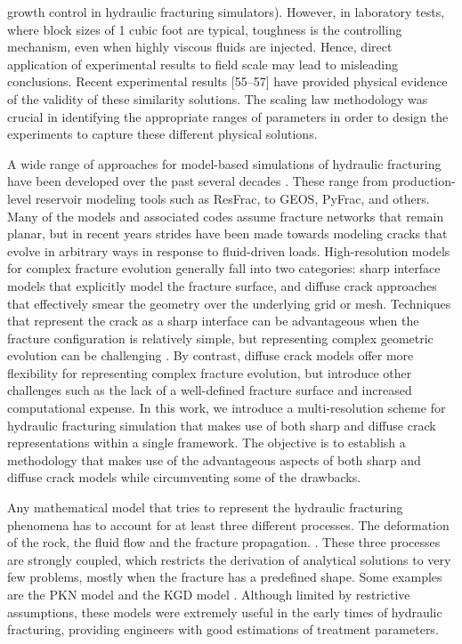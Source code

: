 growth control in hydraulic fracturing simulators). However, in laboratory tests, where block sizes of 1 cubic foot are typical, toughness is the controlling mechanism, even when highly viscous fluids are injected. Hence, direct application of experimental results to field scale may lead to misleading conclusions. Recent experimental results [55–57] have provided physical evidence of the validity of these similarity solutions. The scaling law methodology was crucial in identifying the appropriate ranges of parameters in order to design the experiments to capture these different physical solutions.

    A wide range of approaches for model-based simulations of hydraulic fracturing have been developed over the past several decades \cite{adachi2007computer, lecampion2018numerical}.  These range from production-level reservoir modeling tools such as  ResFrac\cite{mcclure2017three, mcclure2018resfrac}, to GEOS\cite{settgast2012simulation, settgast2014simulation, settgast2017fully}, PyFrac\cite{zia2020pyfrac}, and others.  Many of the models and associated codes assume fracture networks that remain planar, but in recent years strides have been made towards modeling cracks that evolve in arbitrary ways in response to fluid-driven loads. High-resolution models for complex fracture evolution generally fall into two categories: sharp interface models that explicitly model the fracture surface, and diffuse crack approaches that effectively smear the geometry over the underlying grid or mesh.  Techniques that represent the crack as a sharp interface can be advantageous when the fracture configuration is relatively simple, but representing complex geometric evolution can be challenging  \cite{gupta2014simulation, gupta2018coupled, shauer2022three}.  By contrast, diffuse crack models offer more flexibility for representing complex fracture evolution, but introduce other challenges such as the lack of a well-defined fracture surface and increased computational expense\cite{heider2021review}.  In this work, we introduce a multi-resolution scheme for hydraulic fracturing simulation that makes use of both sharp and diffuse crack representations within a single framework. The objective is to establish a methodology that makes use of the advantageous aspects of both sharp and diffuse crack models while circumventing some of the drawbacks.  

    Any mathematical model that tries to represent the hydraulic fracturing phenomena has to account for at least three different processes. The deformation of the rock, the fluid flow and the fracture propagation. \cite{adachi2007computer}. These three processes are strongly coupled, which restricts the derivation of analytical solutions to very few problems, mostly when the fracture has a predefined shape. Some examples are the PKN model \cite{perkins1961widths, sneddon1946opening, nordgren1972propagation} and the KGD model \cite{zheltov19553, geertsma1969rapid}. Although limited by restrictive assumptions, these models were extremely useful in the early times of hydraulic fracturing, providing engineers with good estimations of treatment parameters.

